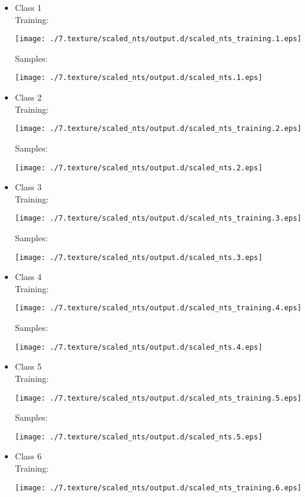 \documentclass{book}
\begin{document}
\begin{itemize}

\item Class 1\\
\label{sec-3_8_1_1}%
Training:

\texttt{[image: ./7.texture/scaled\_nts/output.d/scaled\_nts\_training.1.eps]}

Samples:

\texttt{[image: ./7.texture/scaled\_nts/output.d/scaled\_nts.1.eps]}


\item Class 2\\
\label{sec-3_8_1_2}%
Training:

\texttt{[image: ./7.texture/scaled\_nts/output.d/scaled\_nts\_training.2.eps]}

Samples:

\texttt{[image: ./7.texture/scaled\_nts/output.d/scaled\_nts.2.eps]}


\item Class 3\\
\label{sec-3_8_1_3}%
Training:

\texttt{[image: ./7.texture/scaled\_nts/output.d/scaled\_nts\_training.3.eps]}

Samples:

\texttt{[image: ./7.texture/scaled\_nts/output.d/scaled\_nts.3.eps]}


\item Class 4\\
\label{sec-3_8_1_4}%
Training:

\texttt{[image: ./7.texture/scaled\_nts/output.d/scaled\_nts\_training.4.eps]}

Samples:

\texttt{[image: ./7.texture/scaled\_nts/output.d/scaled\_nts.4.eps]}


\item Class 5\\
\label{sec-3_8_1_5}%
Training:

\texttt{[image: ./7.texture/scaled\_nts/output.d/scaled\_nts\_training.5.eps]}

Samples:

\texttt{[image: ./7.texture/scaled\_nts/output.d/scaled\_nts.5.eps]}


\item Class 6\\
\label{sec-3_8_1_6}%
Training:

\texttt{[image: ./7.texture/scaled\_nts/output.d/scaled\_nts\_training.6.eps]}


\end{itemize}
\end{document}
